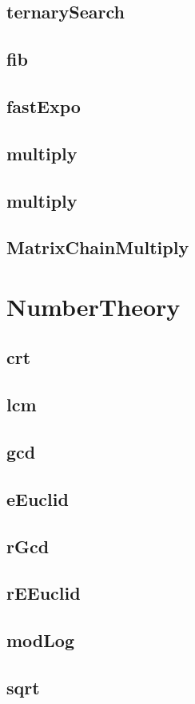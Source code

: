 \documentclass[a4paper]{article}
\begin{document}
\subsection{ternarySearch}
\subsection{fib}
\subsection{fastExpo}
\subsection{multiply}
\subsection{multiply}
\subsection{MatrixChainMultiply}
\section{NumberTheory}
\subsection{crt}
\subsection{lcm}
\subsection{gcd}
\subsection{eEuclid}
\subsection{rGcd}
\subsection{rEEuclid}
\subsection{modLog}
\subsection{sqrt}
\end{document}
